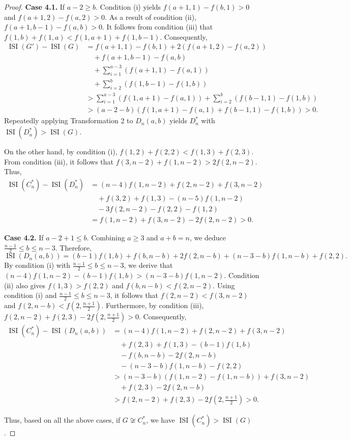 \documentclass[12pt]{article}
\theoremstyle{definition}
\newcommand{\ISI}{\operatorname{ISI}}
\begin{document}
\begin{proof}
\textbf{Case 4.1.} If \(a-2 \geq b\). Condition (i) yields \(f(a+1,1) - f(b,1) > 0\) and \(f(a+1,2) - f(a,2) > 0\). As a result of condition (ii), \(f(a+1,b-1) - f(a,b) > 0\). It follows from condition (iii) that \(f(1,b) + f(1,a) < f(1,a+1) + f(1,b-1)\). Consequently,
\begin{align*}
\ISI(G') - \ISI(G) &= f(a+1,1) - f(b,1) + 2(f(a+1,2) - f(a,2)) \\
&\quad + f(a+1,b-1) - f(a,b) \\
&\quad + \sum_{i=1}^{a-3}(f(a+1,1) - f(a,1)) \\
&\quad + \sum_{i=2}^{b}(f(1,b-1) - f(1,b)) \\[4pt]
&> \sum_{i=1}^{a-3}(f(1,a+1) - f(a,1)) + \sum_{i=2}^{b}(f(b-1,1) - f(1,b)) \\[4pt]
&> (a-2-b)(f(1,a+1) - f(a,1) + f(b-1,1) - f(1,b)) > 0.
\end{align*}
Repeatedly applying Transformation 2 to \(D_n(a,b)\) yields \(D_n^*\) with \(\ISI(D_n^*) > \ISI(G)\).

On the other hand, by condition (i), \(f(1,2) + f(2,2) < f(1,3) + f(2,3)\). From condition (iii), it follows that \(f(3,n-2) + f(1,n-2) > 2f(2,n-2)\). Thus,
\begin{align*}
\ISI(C_n^*) - \ISI(D_n^*) &= (n-4)f(1,n-2) + f(2,n-2) + f(3,n-2) \\
&\quad + f(3,2) + f(1,3) - (n-5)f(1,n-2) \\
&\quad - 3f(2,n-2) - f(2,2) - f(1,2) \\[4pt]
&= f(1,n-2) + f(3,n-2) - 2f(2,n-2) > 0.
\end{align*}

\textbf{Case 4.2.} If \(a-2+1 \leq b\). Combining \(a \geq 3\) and \(a + b = n\), we deduce \(\frac{n-1}{2} \leq b \leq n-3\). Therefore,
\[
\ISI(D_n(a,b)) = (b-1)f(1,b) + f(b,n-b) + 2f(2,n-b) + (n-3-b)f(1,n-b) + f(2,2).
\]
By condition (i) with \(\frac{n-1}{2} \leq b \leq n-3\), we derive that \((n-4)f(1,n-2) - (b-1)f(1,b) > (n-3-b)f(1,n-2)\). Condition (ii) also gives \(f(1,3) > f(2,2)\) and \(f(b,n-b) < f(2,n-2)\). Using condition (i) and \(\frac{n-1}{2} \leq b \leq n-3\), it follows that \(f(2,n-2) < f(3,n-2)\) and \(f(2,n-b) < f\left(2,\frac{n+1}{2}\right)\). Furthermore, by condition (iii), \(f(2,n-2) + f(2,3) - 2f\left(2,\frac{n+1}{2}\right) > 0\). Consequently,
\begin{align*}
\ISI(C_n^*) - \ISI(D_n(a,b)) &= (n-4)f(1,n-2) + f(2,n-2) + f(3,n-2) \\
&\quad + f(2,3) + f(1,3) - (b-1)f(1,b) \\
&\quad - f(b,n-b) - 2f(2,n-b) \\
&\quad - (n-3-b)f(1,n-b) - f(2,2) \\[4pt]
&> (n-3-b)(f(1,n-2) - f(1,n-b)) + f(3,n-2) \\
&\quad + f(2,3) - 2f(2,n-b) \\[4pt]
&> f(2,n-2) + f(2,3) - 2f\left(2,\frac{n+1}{2}\right) > 0.
\end{align*}

Thus, based on all the above cases, if \(G \not\cong C_n^*\), we have \(\ISI(C_n^*) > \ISI(G)\).
\end{proof}
\end{document}
